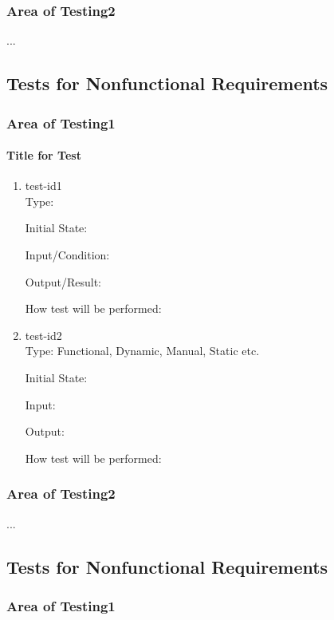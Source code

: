 \documentclass[12pt, titlepage]{article}
\begin{document}
\subsubsection{Area of Testing2}
...
\subsection{Tests for Nonfunctional Requirements}
\subsubsection{Area of Testing1}
		
\paragraph{Title for Test}
\begin{enumerate}
\item{test-id1\\}
Type: 
					
Initial State: 
					
Input/Condition: 
					
Output/Result: 
					
How test will be performed: 
					
\item{test-id2\\}
Type: Functional, Dynamic, Manual, Static etc.
					
Initial State: 
					
Input: 
					
Output: 
					
How test will be performed: 
\end{enumerate}
\subsubsection{Area of Testing2}
...
\subsection{Tests for Nonfunctional Requirements}
\subsubsection{Area of Testing1}
		
\end{document}
